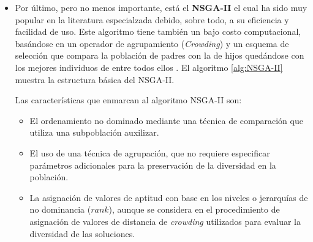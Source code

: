 \begin{itemize}
  \begin{algorithm}
      \begin{algorithmic}[1]			
	    \REQUIRE Problema de Optimizaci\'on.
	\ENSURE Una poblaci\'on evolucionada.
	\STATE $t=0$
	\STATE Inicializar la poblaci\'on aleatoriamente $P_t$
	    \STATE Generar un nuevo individuo $x$ de acuerdo con un operador de variaci\'on aleatoria.
	    \STATE $Q_{t+1}\leftarrow P_t \cup \left\{x \right\}$.
	    \STATE Calcular el frente de Pareto de acuerdo con la asignaci\'on de valores de aptitud con base en los niveles o jerarqu\'ias 
	    de no dominancia ($rank$) de $Q_{t+1}$.
	    \STATE $W \leftarrow$ individuos con la peor clasificaci\'on del frente.
	    \STATE $r \leftarrow$ individuos (en $W$) que menos contribuyen al valor del hipervolumen cubierto por $W$.
	    \STATE $P_{t+1}\leftarrow Q_{t+1} \diagup r$, eliminar los peores inviduos detectados de la poblaci\'on.
	    \STATE $t = t +1$.
	\ENDWHILE
      \end{algorithmic}
  \caption{Estructura b\'asica del SMS-EMOA}
  \label{alg:SMS-EMOA}
  \end{algorithm}
 
  \item Por \'ultimo, pero no menos importante, est\'a el \textbf{NSGA-II} el cual ha sido muy popular 
  en la literatura especialzada debido,  sobre todo, a su eficiencia y facilidad de uso. Este algoritmo tiene tambi\'en un bajo 
  costo computacional, bas\'andose en un operador de agrupamiento (\textit{Crowding}) y un esquema de selecci\'on que compara la 
  poblaci\'on de padres con la de hijos qued\'andose con los mejores individuos de entre todos ellos \cite{deb02}. 
  El algoritmo \ref{alg:NSGA-II} muestra la estructura b\'asica del NSGA-II.
  
  Las caracter\'isticas que enmarcan al algoritmo NSGA-II son:
  
  \begin{itemize}
   \item El ordenamiento no dominado mediante una t\'ecnica de comparaci\'on que utiliza una subpoblaci\'on auxilizar.
   \item El uso de una t\'ecnica de agrupaci\'on, que no requiere especificar par\'ametros adicionales para la preservaci\'on
   de la diversidad en la poblaci\'on.
   \item La asignaci\'on de valores de aptitud con base en los niveles o jerarqu\'ias de no dominancia ($rank$), aunque se considera 
   en el procedimiento de asignaci\'on de valores de distancia de \textit{crowding} utilizados para evaluar la diversidad de las 
   soluciones.
  \end{itemize}



\end{itemize}
